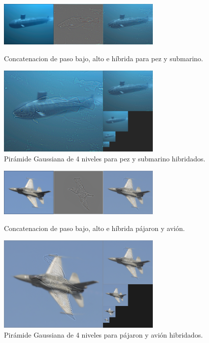\documentclass[12pt]{article}
\begin{document}
\begin{figure}[H]
\centering
\parbox{8cm}{
\includegraphics[width=8cm]{images/ImagenPSCol.png}
\caption{Concatenacion de paso bajo, alto e híbrida para pez y submarino.}
\label{fig:2figsA}}
\begin{minipage}{8cm}
\includegraphics[width=8cm]{images/PirPSCol.png}
\caption{Pirámide Gaussiana de 4 niveles para pez y submarino hibridados.}
\label{fig:2figsB}
\end{minipage}
\end{figure}

\begin{figure}[H]
\centering
\parbox{8cm}{
\includegraphics[width=8cm]{images/ImagenPACol.png}
\caption{Concatenacion de paso bajo, alto e híbrida pájaron y avión.}
\label{fig:2figsA}}
\begin{minipage}{8cm}
\includegraphics[width=8cm]{images/PirPACol.png}
\caption{Pirámide Gaussiana de 4 niveles para pájaron y avión hibridados.}
\label{fig:2figsB}
\end{minipage}
\end{figure}
\end{document}
